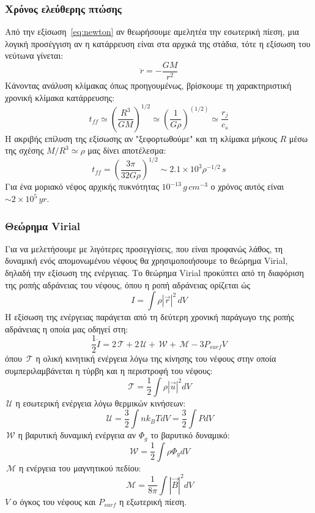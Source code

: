 \documentclass[a4paper,12pt]{memoir}
\newcommand{\TT}{\,\mathcal{T}}
\newcommand{\UU}{\,\mathcal{U}}
\newcommand{\WW}{\,\mathcal{W}}
\newcommand{\MM}{\,\mathcal{M}}
\begin{document}
\subsubsection{Χρόνος ελεύθερης πτώσης}
\label{par:freefall}
Από την εξίσωση~\ref{eq:newton} αν θεωρήσουμε αμελητέα την εσωτερική πίεση, μια λογική προσέγγιση αν η κατάρρευση είναι στα αρχικά της στάδια, τότε η εξίσωση του νεύτωνα γίνεται:
\begin{equation}
\ddot{r}=-\frac{GM}{r^2}
\end{equation}
Κάνοντας ανάλυση κλίμακας όπως προηγουμένως, βρίσκουμε τη χαρακτηριστική χρονική κλίμακα κατάρρευσης:
\begin{equation}
t_{ff}\simeq \left(\frac{R^3}{GM}\right)^{1/2} \simeq \left( \frac{1}{G \rho}\right) ^(1/2) \simeq \frac{r_j}{c_s} 
\end{equation}
Η ακριβής επίλυση της εξίσωσης αν "ξεφορτωθούμε" και τη κλίμακα μήκους $R$ μέσω της σχέσης $M/R^3 \simeq \rho$ μας δίνει αποτέλεσμα:
\begin{equation}
t_{ff}=\left( \frac{3 \pi}{32 G \rho}\right) ^{1/2} \sim 2.1\times 10^3 \rho ^{-1/2} \, s
\end{equation}
Για ένα μοριακό νέφος αρχικής πυκνότητας $10^{-13}\, g\,cm^{-3}$ ο χρόνος αυτός είναι $\sim 2\times 10^5 \, yr$. 

\subsubsection{Θεώρημα Virial}
Για να μελετήσουμε με λιγότερες προσεγγίσεις, που είναι προφανώς λάθος, τη δυναμική ενός απομονωμένου νέφους θα χρησιμοποιήσουμε το θεώρημα Virial, δηλαδή την εξίσωση της ενέργειας.
Το θεώρημα Virial προκύπτει από τη διαφόριση της ροπής αδράνειας του νέφους, όπου η ροπή αδράνειας ορίζεται ώς 
\begin{equation}
I=\int \rho |\vec{r}|^2 \, dV
\end{equation}
Η εξίσωση της ενέργειας παράγεται από τη δεύτερη χρονική παράγωγο της ροπής αδράνειας η οποία μας οδηγεί στη:
\begin{equation}
\frac{1}{2}\ddot{I}=2\TT+2\UU +\WW+\MM -3P_{surf}V
\end{equation}
όπου $\TT$ η ολική κινητική ενέργεια λόγω της κίνησης του νέφους στην οποία συμπεριλαμβάνεται η τύρβη και η περιστροφή του νέφους:
\begin{equation}
\TT = \frac{1}{2} \int \rho |\vec{u}|^2 dV
\end{equation}
$\UU$ η εσωτερική ενέργεια λόγω θερμικών κινήσεων:
\begin{equation}
\UU=\frac{3}{2} \int n k_B T dV=\frac{3}{2} \int P dV
\end{equation}
$\WW$ η βαρυτική δυναμική ενέργεια αν $\Phi _g$ το βαρυτικό δυναμικό:
\begin{equation}
\WW=\frac{1}{2} \int \rho \Phi _g dV
\end{equation}
$\MM$ η ενέργεια του μαγνητικού πεδίου:
\begin{equation}
\MM=\frac{1}{8\pi} \int |\vec{B}|^2 dV
\end{equation}
$V$ ο όγκος του νέφους και $P_{surf}$ η εξωτερική πίεση. 
\end{document}
